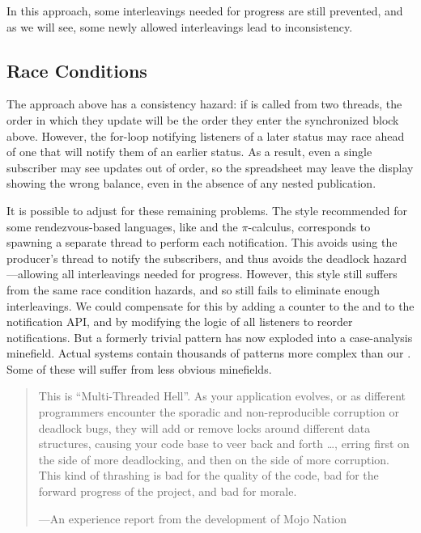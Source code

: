 \documentclass{llncs}
\begin{document}
In this approach, some interleavings needed for progress are still
prevented, and as we will see, some newly allowed interleavings lead
to inconsistency.

\subsection{Race Conditions} 

The approach above has a consistency hazard: if  is
called from two threads, the order in which they update 
will be the order they enter the synchronized block above. However,
the for-loop notifying listeners of a later status may race ahead of
one that will notify them of an earlier status. As a result, even a
single subscriber may see updates out of order, so the spreadsheet may
leave the display showing the wrong balance, even in the absence of
any nested publication.

It is possible to adjust for these remaining problems. The style
recommended for some rendezvous-based languages, like  and the $\pi$-calculus, corresponds to spawning a separate thread
to perform each notification.  This avoids using the producer's thread
to notify the subscribers, and thus avoids the deadlock
hazard---allowing all interleavings needed for progress. However, this
style still suffers from the same race condition hazards, and so still
fails to eliminate enough interleavings. We could compensate for this
by adding a counter to the  and to the notification
API, and by modifying the logic of all listeners to reorder
notifications. But a formerly trivial pattern has now exploded into a
case-analysis minefield. Actual systems contain thousands of patterns
more complex than our . Some of these will suffer
from less obvious minefields.
%
\begin{quotation}
This is ``Multi-Threaded Hell''. As your application evolves, or as
different programmers encounter the sporadic and non-reproducible
corruption or deadlock bugs, they will add or remove locks around
different data structures, causing your code base to veer back and
forth \ldots, erring first on the side of more deadlocking, and then
on the side of more corruption. This kind of thrashing is bad for the
quality of the code, bad for the forward progress of the project, and
bad for morale.
\begin{flushright}
---An experience report from the development of Mojo Nation \cite{zooko:hell}
\end{flushright}
\end{quotation}
\end{document}

